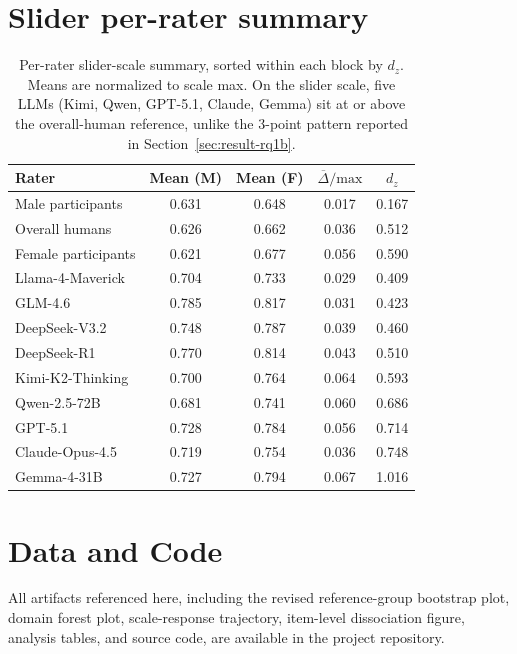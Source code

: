 \documentclass[a4paper,fleqn,review,longmktitle]{cas-sc}
\begin{document}
\section{Slider per-rater summary}
\label{app:slider-summary}

\begin{table}[h]
  \small
  \centering
  \begin{tabular}{lcccc}
    \toprule
    Rater & Mean (M) & Mean (F) & $\overline{\Delta}/\text{max}$ & $d_z$ \\
    \midrule
    Male participants    & 0.631 & 0.648 & 0.017 & 0.167 \\
    Overall humans       & 0.626 & 0.662 & 0.036 & 0.512 \\
    Female participants  & 0.621 & 0.677 & 0.056 & 0.590 \\
    \midrule
    Llama-4-Maverick     & 0.704 & 0.733 & 0.029 & 0.409 \\
    GLM-4.6              & 0.785 & 0.817 & 0.031 & 0.423 \\
    DeepSeek-V3.2        & 0.748 & 0.787 & 0.039 & 0.460 \\
    DeepSeek-R1          & 0.770 & 0.814 & 0.043 & 0.510 \\
    Kimi-K2-Thinking     & 0.700 & 0.764 & 0.064 & 0.593 \\
    Qwen-2.5-72B         & 0.681 & 0.741 & 0.060 & 0.686 \\
    GPT-5.1              & 0.728 & 0.784 & 0.056 & 0.714 \\
    Claude-Opus-4.5      & 0.719 & 0.754 & 0.036 & 0.748 \\
    Gemma-4-31B          & 0.727 & 0.794 & 0.067 & 1.016 \\
    \bottomrule
  \end{tabular}
  \caption{Per-rater slider-scale summary, sorted within each block by $d_z$. Means are normalized to scale max. On the slider scale, five LLMs (Kimi, Qwen, GPT-5.1, Claude, Gemma) sit at or above the overall-human reference, unlike the 3-point pattern reported in Section~\ref{sec:result-rq1b}.}
  \label{tab:dz-slider}
\end{table}

\section*{Data and Code}
All artifacts referenced here, including the revised reference-group bootstrap plot, domain forest plot, scale-response trajectory, item-level dissociation figure, analysis tables, and source code, are available in the project repository.
\end{document}
